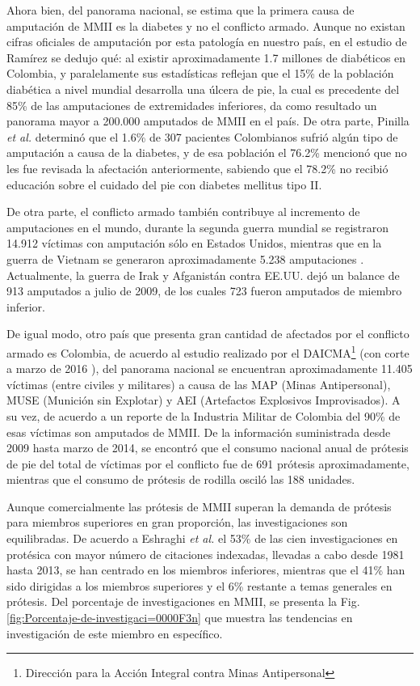 \documentclass[12pt,english]{article}
\begin{document}
Ahora bien, del panorama nacional, se estima que la primera causa
de amputación de MMII es la diabetes y no el conflicto armado. Aunque
no existan cifras oficiales de amputación por esta patología en nuestro
país, en el estudio de Ramírez \cite{Ramirez2014} se dedujo qué:
al existir aproximadamente 1.7 millones de diabéticos en Colombia,
y paralelamente sus estadísticas reflejan que el 15\% de la población
diabética a nivel mundial desarrolla una úlcera de pie, la cual es
precedente del 85\% de las amputaciones de extremidades inferiores,
da como resultado un panorama mayor a 200.000 amputados de MMII en
el país. De otra parte, Pinilla \emph{et al.} \cite{Pinilla2011}
determinó que el 1.6\% de 307 pacientes Colombianos sufrió algún tipo
de amputación a causa de la diabetes, y de esa población el 76.2\%
mencionó que no les fue revisada la afectación anteriormente,  sabiendo
que el 78.2\% no recibió educación sobre el cuidado del pie con diabetes
mellitus tipo II.

De otra parte, el conflicto armado también contribuye al incremento
de amputaciones en el mundo, durante la segunda guerra mundial se
registraron 14.912 víctimas con amputación sólo en Estados Unidos,
mientras que en la guerra de Vietnam se generaron aproximadamente
5.238 amputaciones \cite{Laferrier2010a}. Actualmente, la guerra
de Irak y Afganistán contra EE.UU. dejó un balance de 913 amputados
a julio de 2009, de los cuales 723 fueron amputados de miembro inferior\cite{Fergason2010}. 

De igual modo, otro país que presenta gran cantidad de afectados por
el conflicto armado es Colombia, de acuerdo al estudio realizado por
el DAICMA\footnote{Dirección para la Acción Integral contra Minas Antipersonal}
(con corte a marzo de 2016 \cite{PAICMA}), del panorama nacional
se encuentran aproximadamente 11.405 víctimas (entre civiles y militares)
a causa de las MAP (Minas Antipersonal), MUSE (Munición sin Explotar)
y AEI (Artefactos Explosivos Improvisados). A su vez, de acuerdo a
un reporte de la Industria Militar de Colombia \cite{Prieto2014}
del 90\% de esas víctimas son amputados de MMII. De la información
suministrada desde 2009 hasta marzo de 2014, se encontró que el consumo
nacional anual de prótesis de pie del total de víctimas por el conflicto
fue de 691 prótesis aproximadamente, mientras que el consumo de prótesis
de rodilla osciló las 188 unidades.

Aunque comercialmente las prótesis de MMII superan la demanda de prótesis
para miembros superiores en gran proporción, las investigaciones son
equilibradas. De acuerdo a Eshraghi \emph{et al.}\cite{Eshraghi2013}
el 53\% de las cien investigaciones en protésica con mayor número
de citaciones indexadas, llevadas a cabo desde 1981 hasta 2013, se
han centrado en los miembros inferiores, mientras que el 41\% han
sido dirigidas a los miembros superiores y el 6\% restante a temas
generales en prótesis. Del porcentaje de investigaciones en MMII,
se presenta la Fig. \ref{fig:Porcentaje-de-investigaci=0000F3n} que
muestra las tendencias en investigación de este miembro en específico.
\end{document}
